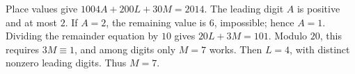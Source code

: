 Place values give $1004A+200L+30M=2014$. The leading digit $A$ is positive and at most $2$. If $A=2$, the remaining value is $6$, impossible; hence $A=1$. Dividing the remainder equation by $10$ gives $20L+3M=101$. Modulo $20$, this requires $3M\equiv1$, and among digits only $M=7$ works. Then $L=4$, with distinct nonzero leading digits. Thus $\boxed{M=7}$.
